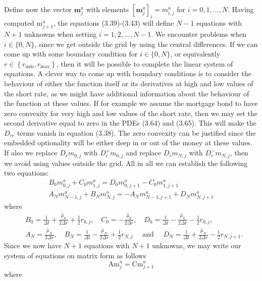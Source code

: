 \documentclass[12pt,twoside]{reedthesis}
\begin{document}
Define now the vector \(\mathbf{m}_{j}^{a}\) with elements \(\left[\mathbf{m}_{j}^{a}\right]_{i}=m_{i, j}^{a}\) for \(i=0,1, \ldots, N\). Having computed \(\mathrm{m}_{j+1}^{a}\), the equations (3.39)-(3.43) will define \(N-1\) equations with \(N+1\) unknowns when setting \(i=1,2, \ldots, N-1\). We encounter problems when \(i \in\{0, N\}\), since we get outside the grid by using the central differences. If we can come up with some boundary condition for \(i \in\{0, N\}\), or equivalently \(r \in\left\{r_{\min }, r_{\max }\right\}\), then it will be possible to complete the linear system of equations. A clever way to come up with boundary conditions is to consider the behaviour of either the function itself or its derivatives at high and low values of the short rate, as we might have additional information about the behaviour of the function at these values. If for example we assume the mortgage bond to have zero convexity for very high and low values of the short rate, then we may set the second derivative equal to zero in the PDEs (3.64) and (3.65). This will make the \(D_{r r}\) terms vanish in equation (3.38). The zero convexity can be justified since the embedded optionality will be either deep in or out of the money at these values. If also we replace \(D_{r} m_{0, j}\) with \(D_{r}^{+} m_{0, j}\) and replace \(D_{r} m_{N, j}\) with \(D_{r}^{-} m_{N, j}\), then we avoid using values outside the grid. All in all we can establish the following two equations:
\[
\begin{gathered}
B_{0} m_{0, j}^{a}+C_{0} m_{1, j}^{a}=D_{0} m_{0, j+1}^{a}-C_{0} m_{1, j+1}^{a} \\
A_{N} m_{N-1, j}^{a}+B_{N} m_{N, j}^{a}=-A_{N} m_{N-1, j+1}^{a}+D_{N} m_{N, j+1}^{a}
\end{gathered}
\]
where
\[
\begin{aligned}
&B_{0}=\frac{1}{\Delta t}+\frac{\hat{\mu}_{0}}{2 \Delta r}+\frac{1}{2} r_{0, j}, \quad C_{0}=-\frac{\hat{\mu}_{0}}{2 \Delta r}, \quad D_{0}=\frac{1}{\Delta t}-\frac{\hat{\mu}_{0}}{2 \Delta r}-\frac{1}{2} r_{0, j}, \\
&A_{N}=\frac{\hat{\mu}_{N}}{2 \Delta r}, \quad B_{N}=\frac{1}{\Delta t}-\frac{\hat{\mu}_{N}}{2 \Delta r}+\frac{1}{2} r_{N, j} \quad \text { and } \quad D_{N}=\frac{1}{\Delta t}+\frac{\hat{\mu}_{N}}{2 \Delta r}-\frac{1}{2} r_{N, j+1} .
\end{aligned}
\]
Since we now have \(N+1\) equations with \(N+1\) unknowns, we may write our system of equations on matrix form as follows
\[
\mathrm{Am}_{j}^{a}=\mathrm{Cm}_{j+1}^{a}
\]
where
\end{document}
